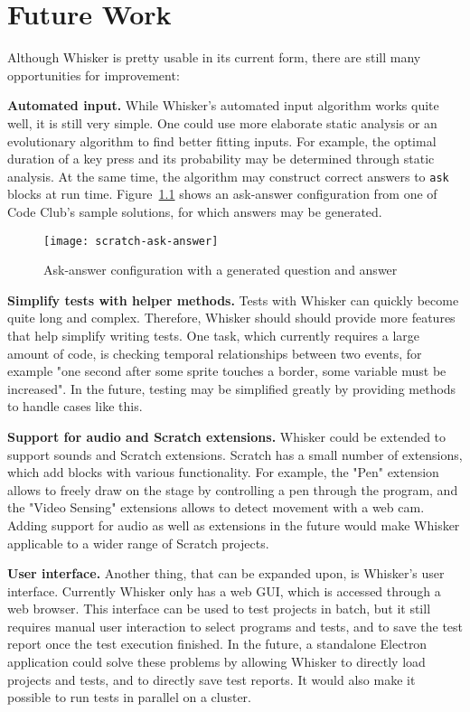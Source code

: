 \chapter{Future Work}
\label{cha:future_work}

Although Whisker is pretty usable in its current form,
there are still many opportunities for improvement:
\parspace

\textbf{Automated input.}
While Whisker's automated input algorithm works quite well, it is still very simple.
One could use more elaborate static analysis or an evolutionary algorithm to find better fitting inputs.
For example, the optimal duration of a key press and its probability may be determined through static analysis.
At the same time, the algorithm may construct correct answers to \texttt{ask} blocks at run time.
Figure~\ref{fig:generated_ask_answer} shows an ask-answer configuration from one of Code Club's sample solutions,
for which answers may be generated.

\begin{figure}[htpb]
    \centering
    \texttt{[image: scratch-ask-answer]}
    \caption{Ask-answer configuration with a generated question and answer}
    \label{fig:generated_ask_answer}
\end{figure}


\textbf{Simplify tests with helper methods.}
Tests with Whisker can quickly become quite long and complex.
Therefore, Whisker should should provide more features that help simplify writing tests.
One task, which currently requires a large amount of code,
is checking temporal relationships between two events,
for example "one second after some sprite touches a border, some variable must be increased".
In the future, testing may be simplified greatly by providing methods to handle cases like this.
\parspace

\textbf{Support for audio and Scratch extensions.}
Whisker could be extended to support sounds and Scratch extensions.
Scratch has a small number of extensions, which add blocks with various functionality.
For example, the "Pen" extension allows to freely draw on the stage by controlling a pen through the program,
and the "Video Sensing" extensions allows to detect movement with a web cam.
Adding support for audio as well as extensions in the future would make Whisker applicable to a wider range of Scratch projects.
\parspace

\textbf{User interface.}
Another thing, that can be expanded upon, is Whisker's user interface.
Currently Whisker only has a web GUI, which is accessed through a web browser.
This interface can be used to test projects in batch, but it still requires manual user interaction to select programs and tests,
and to save the test report once the test execution finished.
In the future, a standalone Electron~\cite{electron} application could solve these problems by allowing Whisker to directly load projects and tests,
and to directly save test reports.
It would also make it possible to run tests in parallel on a cluster.
